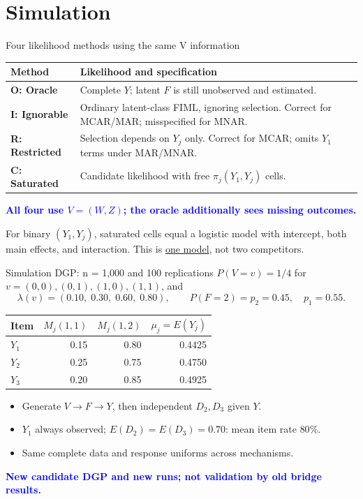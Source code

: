 \documentclass[aspectratio=169,10pt]{beamer}
\newcommand{\bluekey}[1]{\textcolor{Blue}{\textbf{#1}}}
\newcommand{\term}[1]{\underline{#1}}
\begin{document}
\section{Simulation}
\begin{frame}{Four likelihood methods using the same V information}
\begin{tabular}{@{}p{.21\linewidth}p{.73\linewidth}@{}}
\toprule
Method & Likelihood and specification\\
\midrule
\textbf{O: Oracle} & Complete $Y$; latent $F$ is still unobserved and estimated.\\[.7em]
\textbf{I: Ignorable} & Ordinary latent-class FIML, ignoring selection. Correct for MCAR/MAR; misspecified for MNAR.\\[.7em]
\textbf{R: Restricted} & Selection depends on $Y_j$ only. Correct for MCAR; omits $Y_1$ terms under MAR/MNAR.\\[.7em]
\textbf{C: Saturated} & Candidate likelihood with free $\pi_j(Y_1,Y_j)$ cells.\\
\bottomrule
\end{tabular}
\par\medskip
\bluekey{All four use $V=(W,Z)$; the oracle additionally sees missing outcomes.}
\par\smallskip
For binary $(Y_1,Y_j)$, saturated cells equal a logistic model with intercept,
both main effects, and interaction. This is \term{one model}, not two competitors.
\end{frame}

\begin{frame}{Simulation DGP: n = 1,000 and 100 replications}
$P(V=v)=1/4$ for $v=(0,0),(0,1),(1,0),(1,1)$, and
\[
\lambda(v)=(0.10,\;0.30,\;0.60,\;0.80),\qquad
P(F=2)=p_2=0.45,\quad p_1=0.55.
\]
\begin{center}
\begin{tabular}{@{}lrrr@{}}
\toprule
Item & $M_j(1,1)$ & $M_j(1,2)$ & $\mu_j=E(Y_j)$\\
\midrule
$Y_1$ & 0.15 & 0.80 & 0.4425\\
$Y_2$ & 0.25 & 0.75 & 0.4750\\
$Y_3$ & 0.20 & 0.85 & 0.4925\\
\bottomrule
\end{tabular}
\end{center}
\begin{itemize}
\item Generate $V\to F\to Y$, then independent $D_2,D_3$ given $Y$.
\item $Y_1$ always observed; $E(D_2)=E(D_3)=0.70$: mean item rate $80\%$.
\item Same complete data and response uniforms across mechanisms.
\end{itemize}
\bluekey{New candidate DGP and new runs; not validation by old bridge results.}
\end{frame}
\end{document}

